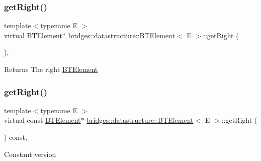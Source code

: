 \subsubsection{\texorpdfstring{getRight()}{getRight()}\hspace{0.1cm}{\footnotesize\ttfamily [1/2]}}
{\footnotesize\ttfamily template$<$typename E $>$ \\
virtual \mbox{\hyperlink{classbridges_1_1datastructure_1_1_b_t_element}{B\+T\+Element}}$\ast$ \mbox{\hyperlink{classbridges_1_1datastructure_1_1_b_t_element}{bridges\+::datastructure\+::\+B\+T\+Element}}$<$ E $>$\+::get\+Right (\begin{DoxyParamCaption}{ }\end{DoxyParamCaption})\hspace{0.3cm}{\ttfamily [inline]}, {\ttfamily [virtual]}}

\begin{DoxyReturn}{Returns}
The right \mbox{\hyperlink{classbridges_1_1datastructure_1_1_b_t_element}{B\+T\+Element}} 
\end{DoxyReturn}
\mbox{\label{classbridges_1_1datastructure_1_1_b_t_element_afc0f4e1454bbdfb6a61ae9acf606e22a}} 
\subsubsection{\texorpdfstring{getRight()}{getRight()}\hspace{0.1cm}{\footnotesize\ttfamily [2/2]}}
{\footnotesize\ttfamily template$<$typename E $>$ \\
virtual const \mbox{\hyperlink{classbridges_1_1datastructure_1_1_b_t_element}{B\+T\+Element}}$\ast$ \mbox{\hyperlink{classbridges_1_1datastructure_1_1_b_t_element}{bridges\+::datastructure\+::\+B\+T\+Element}}$<$ E $>$\+::get\+Right (\begin{DoxyParamCaption}{ }\end{DoxyParamCaption}) const\hspace{0.3cm}{\ttfamily [inline]}, {\ttfamily [virtual]}}

Constant version \mbox{\label{classbridges_1_1datastructure_1_1_b_t_element_a6baeb1237f1879eb6a04fc144a7b55d6}} 
